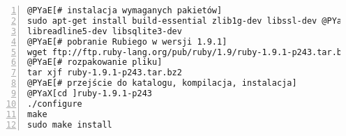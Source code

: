 \begin{Verbatim}[commandchars=@\[\],numbers=left,firstnumber=1,stepnumber=1]
@PYaE[# instalacja wymaganych pakietów]
sudo apt-get install build-essential zlib1g-dev libssl-dev @PYao[\]
libreadline5-dev libsqlite3-dev
@PYaE[# pobranie Rubiego w wersji 1.9.1]
wget ftp://ftp.ruby-lang.org/pub/ruby/1.9/ruby-1.9.1-p243.tar.bz2
@PYaE[# rozpakowanie pliku]
tar xjf ruby-1.9.1-p243.tar.bz2
@PYaE[# przejście do katalogu, kompilacja, instalacja]
@PYaX[cd ]ruby-1.9.1-p243
./configure
make
sudo make install
\end{Verbatim}
